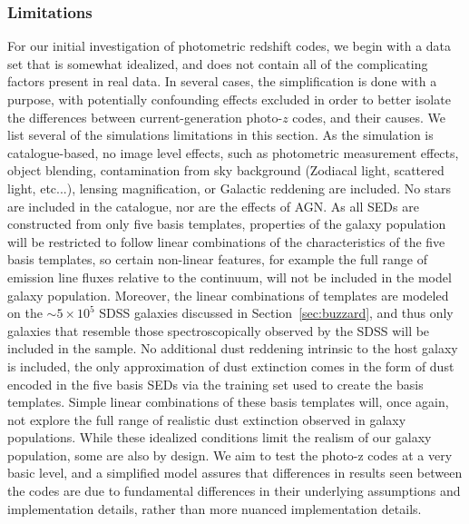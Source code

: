 \subsubsection{Limitations}
\label{sec:buzzlimitations}
For our initial investigation of photometric redshift codes, we begin with a data set that is somewhat idealized, and does not contain all of the complicating factors present in real data.  In several cases, the simplification is done with a purpose, with potentially confounding effects excluded in order to better isolate the differences between current-generation photo-$z$ codes, and their causes.  We list several of the simulations limitations in this section.
As the simulation is catalogue-based, no image level effects, such as photometric measurement effects, object blending, contamination from sky background (Zodiacal light, scattered light, etc...), lensing magnification, or Galactic reddening are included.  No stars are included in the catalogue, nor are the effects of AGN.
As all SEDs are constructed from only five basis templates, properties of the galaxy population will be restricted to follow linear combinations of the characteristics of the five basis templates, so certain non-linear features, for example the full range of emission line fluxes relative to the continuum, will not be included in the model galaxy population.  Moreover, the linear combinations of templates are modeled on the $\sim5\times 10^{5}$ SDSS galaxies discussed in Section~\ref{sec:buzzard}, and thus only galaxies that resemble those spectroscopically observed by the SDSS will be included in the sample.  No additional dust reddening intrinsic to the host galaxy is included, the only approximation of dust extinction comes in the form of dust encoded in the five basis SEDs via the training set used to create the basis templates.  Simple linear combinations of these basis templates will, once again, not explore the full range of realistic dust extinction observed in galaxy populations.
While these idealized conditions limit the realism of our galaxy population, some are also by design.  We aim to test the photo-z codes at a very basic level, and a simplified model assures that differences in results seen between the codes are due to fundamental differences in their underlying assumptions and implementation details, rather than more nuanced implementation details.  

